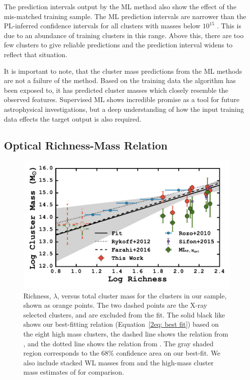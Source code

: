 The prediction intervals output by the ML method also show the effect of the mis-matched training sample. The ML prediction intervals are narrower than the PL-inferred confidence intervals for all clusters with masses below $10^{15}$ \Msol. This is due to an abundance of training clusters in this range. Above this, there are too few clusters to give reliable predictions and the prediction interval widens to reflect that situation.

It is important to note, that the cluster mass predictions from the ML methods are not a failure of the method. Based on the training data the algorithm has been exposed to, it has predicted cluster masses which closely resemble the observed features. Supervised ML shows incredible promise as a tool for future astrophysical investigations, but a deep understanding of how the input training data effects the target output is also required.

\subsection{Optical Richness-Mass Relation}
\begin{figure}
	\begin{center}
		\includegraphics[width=\textwidth]{./figures2/massRichness.pdf} 
	\end{center}
	\caption[Richness versus total cluster mass for the clusters in our sample]{Richness, $\lambda$, versus total cluster mass for the clusters in our sample, shown as orange points. The two dashed points are the X-ray selected clusters, and are excluded from the fit. The solid black like shows our best-fitting relation (Equation~\protect\ref{2eq: best fit}) based on the eight high mass clusters, the dashed line shows the relation from \protect\cite{Farahi2016}, and the dotted line shows the relation from \protect\cite{Rykoff2012}. The gray shaded region corresponds to the 68\% confidence area on our best-fit. We also include stacked WL masses from \protect\cite{Rozo2010} and the high-mass cluster mass estimates of \protect\cite{Sifon2015} for comparison.}
\label{2fig:massRichness} 
\end{figure}

